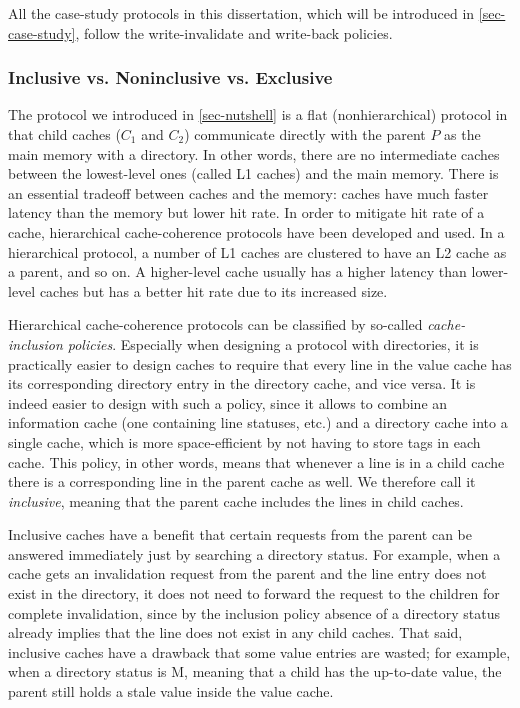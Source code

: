 All the case-study protocols in this dissertation, which will be introduced in \autoref{sec-case-study}, follow the write-invalidate and write-back policies.

\subsubsection{Inclusive vs. Noninclusive vs. Exclusive}

The protocol we introduced in \autoref{sec-nutshell} is a flat (nonhierarchical) protocol in that child caches ($C_1$ and $C_2$) communicate directly with the parent $P$ as the main memory with a directory.
In other words, there are no intermediate caches between the lowest-level ones (called L1 caches) and the main memory.
There is an essential tradeoff between caches and the memory: caches have much faster latency than the memory but lower hit rate.
In order to mitigate hit rate of a cache, hierarchical cache-coherence protocols have been developed and used.
In a hierarchical protocol, a number of L1 caches are clustered to have an L2 cache as a parent, and so on.
A higher-level cache usually has a higher latency than lower-level caches but has a better hit rate due to its increased size.

Hierarchical cache-coherence protocols can be classified by so-called \emph{cache-inclusion policies}.
Especially when designing a protocol with directories, it is practically easier to design caches to require that every line in the value cache has its corresponding directory entry in the directory cache, and vice versa.
It is indeed easier to design with such a policy, since it allows to combine an information cache (one containing line statuses, etc.) and a directory cache into a single cache, which is more space-efficient by not having to store tags in each cache.
This policy, in other words, means that whenever a line is in a child cache there is a corresponding line in the parent cache as well.
We therefore call it \emph{inclusive}, meaning that the parent cache includes the lines in child caches.

Inclusive caches have a benefit that certain requests from the parent can be answered immediately just by searching a directory status.
For example, when a cache gets an invalidation request from the parent and the line entry does not exist in the directory, it does not need to forward the request to the children for complete invalidation, since by the inclusion policy absence of a directory status already implies that the line does not exist in any child caches.
That said, inclusive caches have a drawback that some value entries are wasted; for example, when a directory status is M, meaning that a child has the up-to-date value, the parent still holds a stale value inside the value cache.

